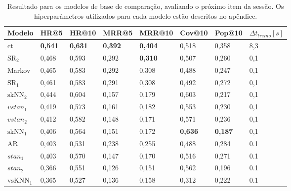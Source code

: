 \begin{table}[htbp]
  \centering
  \begin{tabular}{|l|l|l|l|l|l|l|l|}
    \hline
    Modelo & HR@5 & HR@10 & MRR@5 & MRR@10 & Cov@10 & Pop@10 & $\Delta t_{treino} [s]$ \\
    \hline
    ct & \textbf{0,541} & \textbf{0,631} & \textbf{0,392} & \textbf{0,404} & 0,518 & 0,358 & 8,3 \\
    \hline        
    $\text{SR}_{2}$ & 0,468 & 0,593 & 0,292 & \textbf{0,310} & 0,507 & 0,260 & 0,1 \\
    \hline
    Markov  & 0,465 & 0,583 & 0,292 & 0,308 & 0,488 & 0,247 & 0,1 \\
    \hline
    $\text{SR}_{1}$ & 0,461 & 0,583 & 0,291 & 0,308 & 0,492 & 0,272 & 0,1 \\
    \hline
    $\text{skNN}_{2}$ & 0,444 & 0,604 & 0,157 & 0,179 & 0,603 & 0,217 & 0,1 \\
    \hline
    $vstan_{1}$ & 0,419 & 0,573 & 0,161 & 0,182 & 0,553 & 0,230 & 0,1 \\
    \hline
    $vstan_{2}$ & 0,412 & 0,582 & 0,148 & 0,171 & 0,571 & 0,236 & 0,1 \\
    \hline
    $\text{skNN}_{1}$ & 0,406 & 0,564 & 0,151 & 0,172 & \textbf{0,636} & \textbf{0,187} & 0,1 \\
    \hline
    AR & 0,403 & 0,531 & 0,238 & 0,255 & 0,488 & 0,284 & 0.1 \\
    \hline
    $stan_{1}$ & 0,403 & 0,570 & 0,147 & 0,170 & 0,516 & 0,271 & 0.1 \\
    \hline
    $stan_{2}$ & 0,366 & 0,551 & 0,126 & 0,151 & 0,562 & 0,196 & 0.1 \\
    \hline
$\text{vsKNN}_{1}$ & 0,365 & 0,527 & 0,136 & 0,158 & 0,312 & 0,222 & 0.1 \\
    \hline
      \end{tabular}
  \caption{Resultado para os modelos de base de comparação, avaliando o próximo item da sessão.
  Os hiperparâmetros utilizados para cada modelo estão descritos no apêndice.}
  \label{tab_baseline}  
\end{table}

